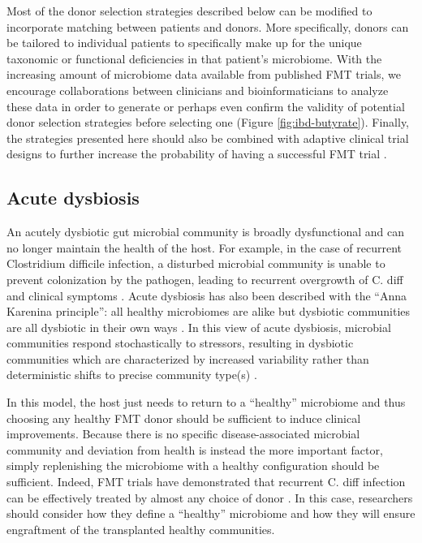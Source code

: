 Most of the donor selection strategies described below can be modified to incorporate matching between patients and donors.
More specifically, donors can be tailored to individual patients to specifically make up for the unique taxonomic or functional deficiencies in that patient's microbiome.
With the increasing amount of microbiome data available from published FMT trials, we encourage collaborations between clinicians and bioinformaticians to analyze these data in order to generate or perhaps even confirm the validity of potential donor selection strategies before selecting one (Figure \ref{fig:ibd-butyrate}).
Finally, the strategies presented here should also be combined with adaptive clinical trial designs to further increase the probability of having a successful FMT trial \cite{Olesen2017}.

\subsection{Acute dysbiosis}

An acutely dysbiotic gut microbial community is broadly dysfunctional and can no longer maintain the health of the host.
For example, in the case of recurrent Clostridium difficile infection, a disturbed microbial community is unable to prevent colonization by the pathogen, leading to recurrent overgrowth of C. diff and clinical symptoms \cite{Britton2014}.
Acute dysbiosis has also been described with the “Anna Karenina principle”: all healthy microbiomes are alike but dysbiotic communities are all dysbiotic in their own ways \cite{Zaneveld2017}.
In this view of acute dysbiosis, microbial communities respond stochastically to stressors, resulting in dysbiotic communities which are characterized by increased variability rather than deterministic shifts to precise community type(s) \cite{Zaneveld2017}.

In this model, the host just needs to return to a “healthy” microbiome and thus choosing any healthy FMT donor should be sufficient to induce clinical improvements.
Because there is no specific disease-associated microbial community and deviation from health is instead the more important factor, simply replenishing the microbiome with a healthy configuration should be sufficient.
Indeed, FMT trials have demonstrated that recurrent C. diff infection can be effectively treated by almost any choice of donor \cite{Osman2016}.
In this case, researchers should consider how they define a “healthy” microbiome and how they will ensure engraftment of the transplanted healthy communities.

